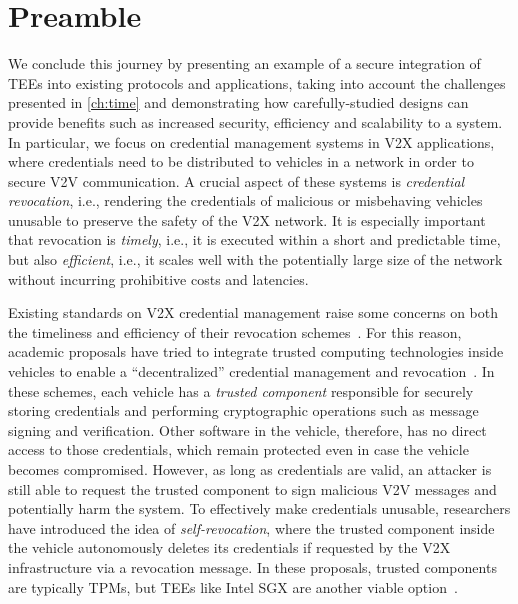 \section*{Preamble}

We conclude this journey by presenting an example of a secure integration of
\acsp{TEE} into existing protocols and applications, taking into account the
challenges presented in \cref{ch:time} and demonstrating how carefully-studied
designs can provide benefits such as increased security, efficiency and
scalability to a system. In particular, we focus on credential management
systems in \ac{V2X} applications, where credentials need to be distributed to
vehicles in a network in order to secure \ac{V2V} communication. A crucial
aspect of these systems is \emph{credential revocation}, i.e., rendering the
credentials of malicious or misbehaving vehicles unusable to preserve the safety
of the \ac{V2X} network. It is especially important that revocation is
\emph{timely}, i.e., it is executed within a short and predictable time, but
also \emph{efficient}, i.e., it scales well with the potentially large size of
the network without incurring prohibitive costs and latencies.

Existing standards on \ac{V2X} credential management raise some concerns on both
the timeliness and efficiency of their revocation
schemes~\cite{yoshizawa2022v2x_survey}. For this reason, academic proposals have
tried to integrate trusted computing technologies inside vehicles to enable a
``decentralized'' credential management and
revocation~\cite{forster2015rewire,whitefield2017privacy,desmoulins2019practical,hicks2020vehicular,larsen2021daa}.
In these schemes, each vehicle has a \emph{trusted component} responsible for
securely storing credentials and performing cryptographic operations such as
message signing and verification. Other software in the vehicle, therefore, has
no direct access to those credentials, which remain protected even in case the
vehicle becomes compromised. However, as long as credentials are valid, an
attacker is still able to request the trusted component to sign malicious
\ac{V2V} messages and potentially harm the system. To effectively make
credentials unusable, researchers have introduced the idea of
\emph{self-revocation}, where the trusted component inside the vehicle
autonomously deletes its credentials if requested by the \ac{V2X} infrastructure
via a revocation message. In these proposals, trusted components are typically
\acsp{TPM}, but \acsp{TEE} like Intel \acs{SGX} are another viable
option~\cite{jangid2022towards}.

